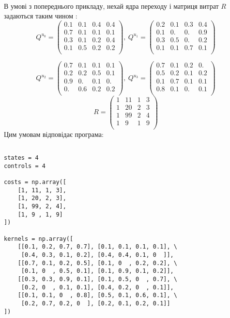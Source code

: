 \documentclass[oneside,14pt]{extarticle}
\begin{document}
\begin{example} В умові з попереднього прикладу, нехай ядра переходу і матриця витрат \(R\) задаються таким чином :
\[Q^{u_0} = \left(\begin{matrix}
0.1 & 0.1 & 0.4 & 0.4 \\
0.7 & 0.1 & 0.1 & 0.1 \\
0.3 & 0.1 & 0.2 & 0.4 \\
0.1 & 0.5 & 0.2 & 0.2 \\
\end{matrix}\right),\
Q^{u_1} = \left(\begin{matrix}
0.2 & 0.1 & 0.3 & 0.4 \\
0.1 & 0.  & 0.  & 0.9 \\
0.3 & 0.5 & 0.  & 0.2 \\
0.1 & 0.1 & 0.7 & 0.1 \\
\end{matrix}\right) \]

\[Q^{u_2} = \left(\begin{matrix}
0.7 & 0.1 & 0.1 & 0.1 \\
0.2 & 0.2 & 0.5 & 0.1 \\
0.9 & 0.  & 0.1 & 0.  \\
0.  & 0.6 & 0.2 & 0.2 \\
\end{matrix}\right),\ 
Q^{u_3} = \left(\begin{matrix}
0.7 & 0.1 & 0.2 & 0.  \\
0.5 & 0.2 & 0.1 & 0.2 \\
0.1 & 0.7 & 0.1 & 0.1 \\
0.8 & 0.1 & 0.  & 0.1 \\
\end{matrix}\right) \] 
\[R = \left(\begin{matrix}
1 & 11 & 1 & 3 \\
1 & 20 & 2 & 3 \\
1 & 99 & 2 & 4 \\
1 & 9  & 1 & 9 \\
\end{matrix}\right)\]
Цим умовам відповідає програма:
\begin{lstlisting}

states = 4
controls = 4

costs = np.array([
    [1, 11, 1, 3],
    [1, 20, 2, 3],
    [1, 99, 2, 4],
    [1, 9 , 1, 9]
])

kernels = np.array([
    [[0.1, 0.2, 0.7, 0.7], [0.1, 0.1, 0.1, 0.1], \
     [0.4, 0.3, 0.1, 0.2], [0.4, 0.4, 0.1, 0  ]],
    [[0.7, 0.1, 0.2, 0.5], [0.1, 0  , 0.2, 0.2], \
     [0.1, 0  , 0.5, 0.1], [0.1, 0.9, 0.1, 0.2]],
    [[0.3, 0.3, 0.9, 0.1], [0.1, 0.5, 0  , 0.7], \
     [0.2, 0  , 0.1, 0.1], [0.4, 0.2, 0  , 0.1]],
    [[0.1, 0.1, 0  , 0.8], [0.5, 0.1, 0.6, 0.1], \
     [0.2, 0.7, 0.2, 0  ], [0.2, 0.1, 0.2, 0.1]]
])


\end{lstlisting}
\end{example}
\end{document}
